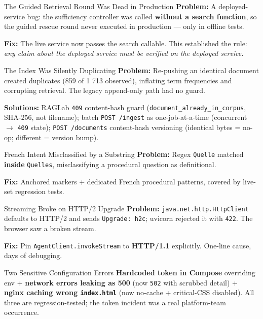\documentclass[a4paper,12pt]{report}
\begin{document}
\begin{problembox}{The Guided Retrieval Round Was Dead in Production}
\textbf{Problem:} A deployed-service bug: the sufficiency controller was called \textbf{without a search function}, so the guided rescue round never executed in production --- only in offline tests.

\textbf{Fix:} The live service now passes the search callable. This established the rule: \textit{any claim about the deployed service must be verified on the deployed service.}
\end{problembox}

\begin{problembox}{The Index Was Silently Duplicating}
\textbf{Problem:} Re-pushing an identical document created duplicates (859 of 1 713 observed), inflating term frequencies and corrupting retrieval. The legacy append-only path had no guard.

\textbf{Solutions:} RAGLab \texttt{409} content-hash guard (\texttt{document\_already\_in\_corpus}, SHA-256, not filename); batch \texttt{POST /ingest} as one-job-at-a-time (concurrent $\rightarrow$ \texttt{409} state); \texttt{POST /documents} content-hash versioning (identical bytes = no-op; different = version bump).
\end{problembox}

\begin{problembox}{French Intent Misclassified by a Substring}
\textbf{Problem:} Regex \texttt{Quelle} matched \textbf{inside} \texttt{Quelles}, misclassifying a procedural question as definitional.

\textbf{Fix:} Anchored markers + dedicated French procedural patterns, covered by live-set regression tests.
\end{problembox}

\begin{problembox}{Streaming Broke on HTTP/2 Upgrade}
\textbf{Problem:} \texttt{java.net.http.HttpClient} defaults to HTTP/2 and sends \texttt{Upgrade: h2c}; uvicorn rejected it with \texttt{422}. The browser saw a broken stream.

\textbf{Fix:} Pin \texttt{AgentClient.invokeStream} to \textbf{HTTP/1.1} explicitly. One-line cause, days of debugging.
\end{problembox}

\begin{problembox}{Two Sensitive Configuration Errors}
\textbf{Hardcoded token in Compose} overriding env + \textbf{network errors leaking as 500} (now \texttt{502} with scrubbed detail) + \textbf{nginx caching wrong \texttt{index.html}} (now no-cache + critical-CSS disabled). All three are regression-tested; the token incident was a real platform-team occurrence.
\end{problembox}
\end{document}
